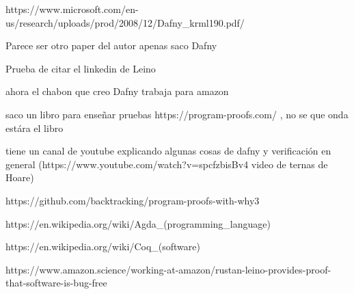 \documentclass[runningheads]{llncs}
\begin{document}
https://www.microsoft.com/en-us/research/uploads/prod/2008/12/Dafny\_krml190.pdf/

Parece ser otro paper del autor apenas saco Dafny

 Prueba de citar el linkedin de Leino\cite{linkedinLeino}

ahora el chabon que creo Dafny trabaja para amazon

saco un libro para enseñar pruebas https://program-proofs.com/ , no se que onda estára el libro

tiene un canal de youtube explicando algunas cosas de dafny y verificación en general (https://www.youtube.com/watch?v=spcfzbisBv4 video de ternas de Hoare)

https://github.com/backtracking/program-proofs-with-why3

https://en.wikipedia.org/wiki/Agda\_(programming\_language)

https://en.wikipedia.org/wiki/Coq\_(software)

https://www.amazon.science/working-at-amazon/rustan-leino-provides-proof-that-software-is-bug-free


\end{document}
